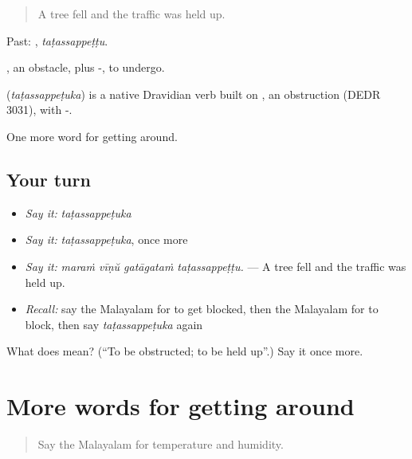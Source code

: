 \begin{quote}
A tree fell and the traffic was held up.
\end{quote}

Past: , \emph{taṭassappeṭṭu}.

, an obstacle, plus -, to undergo.

\begin{cousinweb}
\textbf{} (\emph{taṭassappeṭuka}) is a native Dravidian verb built on , an obstruction (DEDR 3031), with -.
\end{cousinweb}

\begin{grammarlens}[title={What you've built}]
One more word for getting around.
\end{grammarlens}

\subsection*{Your turn}
\begin{itemize}
\raggedright
  \item \emph{Say it:} \emph{taṭassappeṭuka}
  \item \emph{Say it:} \emph{taṭassappeṭuka}, once more
  \item \emph{Say it:} \emph{maraṁ vīṇŭ gatāgataṁ taṭassappeṭṭu.} — A tree fell and the traffic was held up.
  \item \emph{Recall:} say the Malayalam for to get blocked, then the Malayalam for to block, then say \emph{taṭassappeṭuka} again
\end{itemize}

\begin{tcolorbox}[breakable,colback=teal!4,colframe=teal!35!black,title={Before you move on}]
What does  mean? (\textquotedblleft{}To be obstructed; to be held up\textquotedblright{}.) Say it once more.
\end{tcolorbox}
\section[(dialogue)]{More words for getting around}

\label{lesson:ML-R516-review-509-516}



\begin{quote}
Say the Malayalam for temperature and humidity.
\end{quote}

